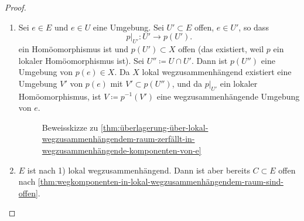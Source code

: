 \begin{proof}
    \begin{enumerate}[1)]
        \item Sei $e\in E$ und $e\in U$ eine Umgebung. Sei $U' \subset E$ offen, $e\in U'$, so dass
            \[
                p|_{U'}\colon U' \to p(U')
            .\] 
            ein Homöomorphismus ist und $p(U')\subset X$ offen (das existiert, weil $p$ ein lokaler Homöomorphismus ist). Sei  $U'' \coloneqq  U \cap U'$. Dann ist $p(U'')$ eine Umgebung von  $p(e) \in X$. Da $X$ lokal wegzusammenhängend existiert eine Umgebung  $V'$ von  $p(e)$ mit  $V'\subset p(U'')$, und da $p|_{U'}$ ein lokaler Homöomorphismus, ist $V \coloneqq  p^{-1} (V')$ eine wegzusammenhängende Umgebung von $e$.

\begin{figure}[ht]
    \centering
    \caption{Beweisskizze zu \autoref{thm:überlagerung-über-lokal-wegzusammenhängendem-raum-zerfällt-in-wegzusammenhängende-komponenten-von-e}}
    \label{fig:beweis-von-überlagerung-eines-wegzusammenhängenden-raumes}
\end{figure}


        \item  $E$ ist nach 1) lokal wegzusammenhängend. Dann ist aber bereits  $C\subset E$ offen nach \autoref{thm:wegkomponenten-in-lokal-wegzusammenhängendem-raum-sind-offen}.


\end{enumerate}
\end{proof}
